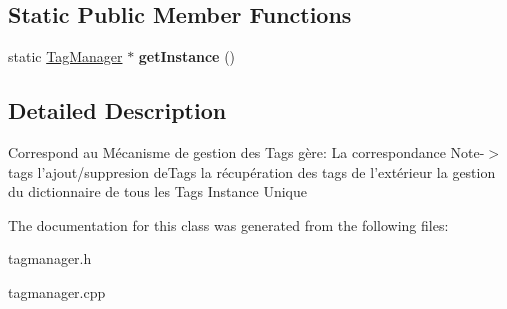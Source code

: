 \subsection*{\-Static \-Public \-Member \-Functions}
\begin{DoxyCompactItemize}
\item 
\hypertarget{classTagManager_af7de9966f3731509eef656f015df32c8}{static \hyperlink{classTagManager}{\-Tag\-Manager} $\ast$ {\bfseries get\-Instance} ()}\label{classTagManager_af7de9966f3731509eef656f015df32c8}

\end{DoxyCompactItemize}


\subsection{\-Detailed \-Description}
\-Correspond au \-Mécanisme de gestion des \-Tags gère\-: \-La correspondance \-Note-\/$>$tags l'ajout/suppresion de\-Tags la récupération des tags de l'extérieur la gestion du dictionnaire de tous les \-Tags \-Instance \-Unique 

\-The documentation for this class was generated from the following files\-:\begin{DoxyCompactItemize}
\item 
tagmanager.\-h\item 
tagmanager.\-cpp\end{DoxyCompactItemize}
